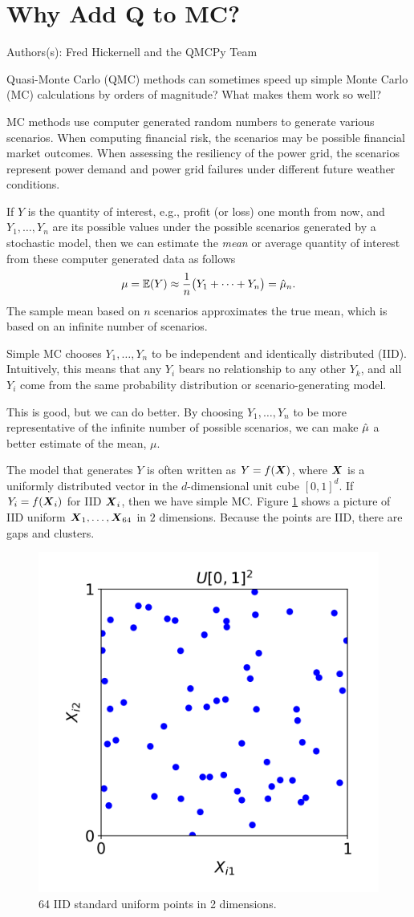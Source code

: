 \documentclass{article}
\newcommand{\blogpost}[3]{\newpage%
\section{#1}%
\begin{refsection}%
	Authors(s): #2 and the QMCPy Team\bigskip #3%
\printbibliography[heading=subbibliography]
\end{refsection}
} %
\begin{document}
\blogpost{Why Add Q to MC?}{Fred Hickernell}{\label{WhyQ}

Quasi-Monte Carlo (QMC) methods can sometimes speed up simple Monte Carlo (MC) calculations by orders of magnitude?  What makes them work so well?

MC methods use computer generated random numbers to generate various scenarios.  When computing financial risk, the scenarios may be possible financial market outcomes.  When assessing the resiliency of the power grid, the scenarios represent power demand and power grid failures under different future weather conditions.

If $Y$ is the quantity of interest, e.g., profit (or loss) one month from now, and $Y_1, \ldots, Y_n$ are its possible values under the possible scenarios generated by a stochastic model, then we can estimate the \emph{mean} or average quantity of interest from these computer generated data as follows
\[
\mu = \operatorname{\mathbb{E}}(Y) \approx \frac 1n \bigl ( Y_1 + \cdots + Y_n \bigr) = \hat{\mu}_n.
\]
The sample mean based on $n$ scenarios approximates the true mean, which is based on an infinite number of scenarios.

Simple MC chooses $Y_1, \ldots, Y_n$ to be independent and identically distributed (IID).  Intuitively, this means that any $Y_i$ bears no relationship to any other $Y_k$, and all $Y_i$ come from the same probability distribution or scenario-generating model.

This is good, but we can do better.  By choosing $Y_1, \ldots, Y_n$ to be more representative of the infinite number of possible scenarios, we can make $\hat{\mu}$ a better estimate of the mean, $\mu$.

The model that generates $Y$ is often written as $Y= f(\boldsymbol{X})$, where $\boldsymbol{X}$ is a uniformly distributed vector in the $d$-dimensional unit cube $[0,1]^d$.  If $Y_i = f(\boldsymbol{X}_i)$ for IID $\boldsymbol{X}_i$, then we have simple MC.  Figure \ref{fig:iid_pts} shows a picture of IID uniform  $\boldsymbol{X}_1, \ldots, \boldsymbol{X}_{64}$ in $2$ dimensions.  Because the points are IID, there are gaps and clusters.

\begin{figure}[H]
    \centering
    \includegraphics[width=.6\textwidth]{figures/iid_uniform_pts.png}
    \caption{64 IID standard uniform points in 2 dimensions.}
    \label{fig:iid_pts}
\end{figure}

}
\end{document}

